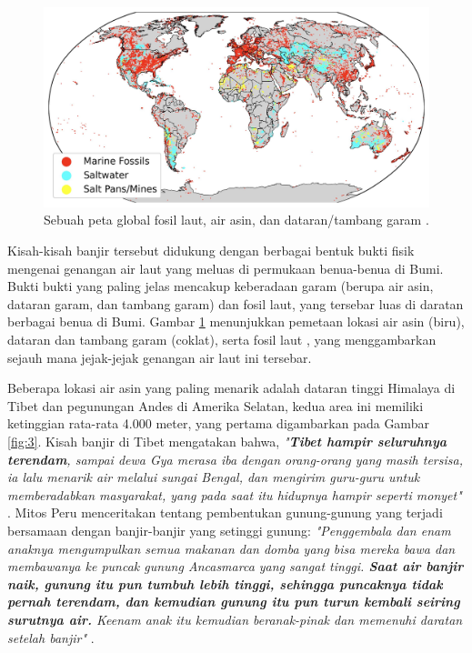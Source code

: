 \documentclass[10pt,twocolumn,letterpaper]{article}
\begin{document}
\begin{figure}[t]
\begin{center}
\includegraphics[width=1\textwidth]{marine.jpg}
\end{center}
   \caption{Sebuah peta global fosil laut, air asin, dan dataran/tambang garam \cite{15,16,86,87}.}
   \label{fig:2}
\end{figure}

Kisah-kisah banjir tersebut didukung dengan berbagai bentuk bukti fisik mengenai genangan air laut yang meluas di permukaan benua-benua di Bumi. Bukti bukti yang paling jelas mencakup keberadaan garam (berupa air asin, dataran garam, dan tambang garam) dan fosil laut, yang tersebar luas di daratan berbagai benua di Bumi. Gambar \ref{fig:2} menunjukkan pemetaan lokasi air asin (biru), dataran dan tambang garam (coklat), serta fosil laut \cite{15,16,86,87}, yang menggambarkan sejauh mana jejak-jejak genangan air laut ini tersebar.

Beberapa lokasi air asin yang paling menarik adalah dataran tinggi Himalaya di Tibet dan pegunungan Andes di Amerika Selatan, kedua area ini memiliki ketinggian rata-rata 4.000 meter, yang pertama digambarkan pada Gambar \ref{fig:3}. Kisah banjir di Tibet mengatakan bahwa, \textit{"\textbf{Tibet hampir seluruhnya terendam}, sampai dewa Gya merasa iba dengan orang-orang yang masih tersisa, ia lalu menarik air melalui sungai Bengal, dan mengirim guru-guru untuk memberadabkan masyarakat, yang pada saat itu hidupnya hampir seperti monyet"} \cite{3}. Mitos Peru menceritakan tentang pembentukan gunung-gunung yang terjadi bersamaan dengan banjir-banjir yang setinggi gunung: \textit{"Penggembala dan enam anaknya mengumpulkan semua makanan dan domba yang bisa mereka bawa dan membawanya ke puncak gunung Ancasmarca yang sangat tinggi. \textbf{Saat air banjir naik, gunung itu pun tumbuh lebih tinggi, sehingga puncaknya tidak pernah terendam, dan kemudian gunung itu pun turun kembali seiring surutnya air.} Keenam anak itu kemudian beranak-pinak dan memenuhi daratan setelah banjir"} \cite{3}.
\end{document}
